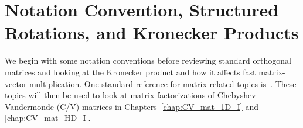 \chapter{Notation Convention, Structured Rotations, and Kronecker Products}
\label{chap:K_and_R}

We begin with some notation conventions before reviewing
standard orthogonal matrices and
looking at the Kronecker product and how it affects fast matrix-vector
multiplication. One standard reference for matrix-related topics is~\cite{gvl4}.
These topics will then be used to look at
matrix factorizations of Chebyshev-Vandermonde (C\=/V) matrices
in Chapters~\ref{chap:CV_mat_1D_I} and \ref{chap:CV_mat_HD_I}.

